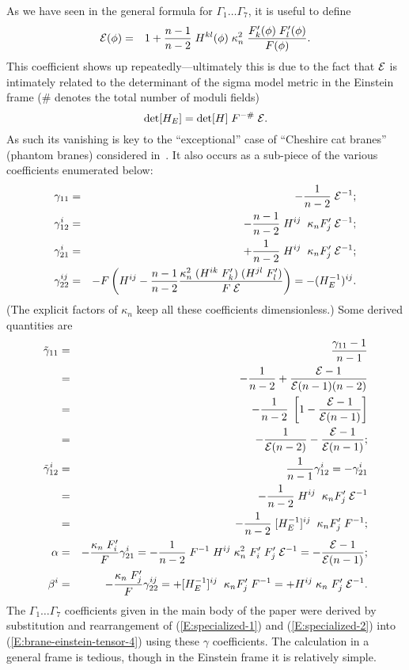 \documentclass[a4paper,10pt]{article}
\begin{document}
{As we have seen in the general formula for $\Gamma_1\dots\Gamma_7$, it
is useful to define
%
\begin{eqnarray}
{\mathcal E}(\phi) &=& 
1  + 
{n-1\over n-2} \;H^{kl}(\phi) \;\kappa_n^2 \; 
{F'_k(\phi) \; F'_l(\phi) \over F(\phi)}.
\end{eqnarray}
%
This coefficient shows up repeatedly---ultimately this is due to the
fact that ${\mathcal E}$ is intimately related to the determinant of the sigma
model metric in the Einstein frame ($\#$ denotes the total number of moduli fields)
%
\begin{equation}
\det[H_E]  = \det[H] \; F^{-\#} \; {\mathcal E}.
\end{equation}
%
As such its vanishing is key to the ``exceptional'' case of ``Cheshire
cat branes'' (phantom branes) considered
in~\cite{generalized-junction}.  It also occurs as a sub-piece of the
various coefficients enumerated below:
%
\begin{eqnarray}
\gamma_{11} &=& 
- {1\over n-2} \; {\mathcal E}^{-1};
\\
\gamma_{12}^i &=& 
- {n-1\over n-2} \; H^{ij} \; \; \kappa_n F'_j \; {\mathcal E}^{-1};
\\
\gamma_{21}^i &=&  
+  {1\over n-2} \; H^{ij} \; \; \kappa_n F'_j \; {\mathcal E}^{-1};
\\
\gamma_{22}^{ij} &=& 
-  
F \left( 
H^{ij} - 
{n-1\over n-2} 
{\kappa_n^2 \; (H^{ik} \; F'_k) \; (H^{jl} \; F'_l) \over F \; {\mathcal E}}
\right) 
= - (H_E^{-1})^{ij}.
\end{eqnarray}
%
(The explicit factors of $\kappa_n$ keep all these coefficients
dimensionless.)  Some derived quantities are
%
\begin{eqnarray}
\tilde\gamma_{11} &=& 
{\gamma_{11}-1\over n-1} 
\\
&=& - {1\over n-2} +{{\mathcal E}-1\over{\mathcal E}(n-1)(n-2)}
\\
&=& - {1\over n-2}\; \left[1- {{\mathcal E}-1\over{\mathcal E}(n-1)}\right]
\\
&=& - {1\over{\mathcal E}(n-2)} -{{\mathcal E}-1\over{\mathcal E}(n-1)};
\\
\tilde\gamma_{12}^i &=& {1\over n-1} \gamma_{12}^i 
= - \gamma_{21}^i 
\\
&=& - {1\over n-2} \; H^{ij} \; \; \kappa_n F'_j \; {\mathcal E}^{-1} 
\\
&=& - {1\over n-2} \; [H_E^{-1}]^{ij} \; \; \kappa_n F'_j \; F^{-1} ;
\\
\alpha &=&  -{\kappa_n \; F'_i\over F} \gamma^i_{21} 
= -  {1\over n-2} \; F^{-1} 
\;H^{ij} \; \kappa_n^2  \;F'_i  \;F'_j \; {\mathcal E}^{-1} = -{{\mathcal E}-1\over{\mathcal E}(n-1)};
\\
\beta^i &=& - {\kappa_n \; F'_j\over F} \gamma_{22}^{ij} 
=  +  [H_E^{-1}]^{ij} \; \; \kappa_n F'_j \; F^{-1}
=  + H^{ij} \; {\kappa_n \; F'_j} \; {\mathcal E}^{-1}.
\end{eqnarray}
%
The $\Gamma_1\dots\Gamma_7$ coefficients given in the main body of the
paper were derived by substitution and rearrangement of
(\ref{E:specialized-1}}) and (\ref{E:specialized-2}) into
(\ref{E:brane-einstein-tensor-4}) using these $\gamma$
coefficients. The calculation in a general frame is tedious, though in
the Einstein frame it is relatively simple.
\end{document}
